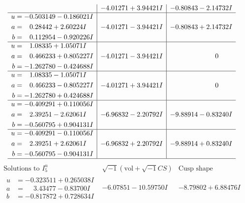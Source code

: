 \documentclass[1p]{elsarticle_modified}
\theoremstyle{definition}
\newcommand{\I}{\sqrt{-1}}
\begin{document}
$$\begin{array}{c|c|c}
 & -4.01271 + 3.94421 I & -0.80843 - 2.14732 I \\ \hline\begin{aligned}
u &= -0.503149 - 0.186021 I \\
a &= \phantom{-}0.28442 + 2.60224 I \\
b &= \phantom{-}0.112954 - 0.920226 I\end{aligned}
 & -4.01271 - 3.94421 I & -0.80843 + 2.14732 I \\ \hline\begin{aligned}
u &= \phantom{-}1.08335 + 1.05071 I \\
a &= \phantom{-}0.466233 + 0.805227 I \\
b &= -1.262780 - 0.424688 I\end{aligned}
 & -4.01271 - 3.94421 I & \phantom{-0.000000 } 0 \\ \hline\begin{aligned}
u &= \phantom{-}1.08335 - 1.05071 I \\
a &= \phantom{-}0.466233 - 0.805227 I \\
b &= -1.262780 + 0.424688 I\end{aligned}
 & -4.01271 + 3.94421 I & \phantom{-0.000000 } 0 \\ \hline\begin{aligned}
u &= -0.409291 + 0.110056 I \\
a &= \phantom{-}2.39251 - 2.62061 I \\
b &= -0.560795 + 0.904131 I\end{aligned}
 & -6.96832 - 2.20792 I & -9.88914 - 0.83240 I \\ \hline\begin{aligned}
u &= -0.409291 - 0.110056 I \\
a &= \phantom{-}2.39251 + 2.62061 I \\
b &= -0.560795 - 0.904131 I\end{aligned}
 & -6.96832 + 2.20792 I & -9.88914 + 0.83240 I\\
 \hline 
 \end{array}$$\newpage$$\begin{array}{c|c|c}  
\text{Solutions to }I^u_{5}& \I (\text{vol} + \sqrt{-1}CS) & \text{Cusp shape}\\
 \hline 
\begin{aligned}
u &= -0.323511 + 0.265038 I \\
a &= \phantom{-}3.43477 - 0.83700 I \\
b &= -0.817872 + 0.728634 I\end{aligned}
 & -6.07851 - 10.59750 I & -8.79802 + 6.88476 I \\ \hline\begin{aligned}

\end{aligned}
\end{array}$$
\end{document}
